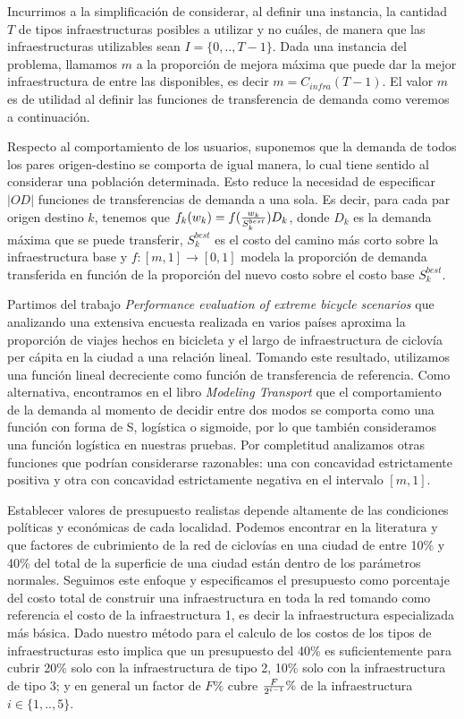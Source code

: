 \documentclass{article}
\begin{document}
  Incurrimos a la simplificación de considerar, al definir una instancia, la cantidad $T$ de tipos infraestructuras posibles a utilizar y no cuáles, de manera que las infraestructuras utilizables sean $I = \{0,.., T - 1\}$. Dada una instancia del problema, llamamos $m$ a la proporción de mejora máxima que puede dar la mejor infraestructura de entre las disponibles, es decir $m = C_{infra}(T - 1)$. El valor $m$ es de utilidad al definir las funciones de transferencia de demanda como veremos a continuación.

  Respecto al comportamiento de los usuarios, suponemos que la demanda de todos los pares origen-destino se comporta de igual manera, lo cual tiene sentido al considerar una población determinada. Esto reduce la necesidad de especificar $|OD|$ funciones de transferencias de demanda a una sola. Es decir, para cada par origen destino $k$, tenemos que $f_k(w_k) = f({w_k \over S^{best}_k})D_k$, donde $D_k$ es la demanda máxima que se puede transferir, $S^{best}_k$ es el costo del camino más corto sobre la infraestructura base y $f: [m, 1] \rightarrow [0, 1]$ modela la proporción de demanda transferida en función de la proporción del nuevo costo sobre el costo base $S^{best}_k$.

  Partimos del trabajo {\it Performance evaluation of extreme bicycle scenarios} \cite{shwe2014} que analizando una extensiva encuesta realizada en varios países aproxima la proporción de viajes hechos en bicicleta y el largo de infraestructura de ciclovía per cápita en la ciudad a una relación lineal. Tomando este resultado, utilizamos una función lineal decreciente como función de transferencia de referencia. Como alternativa, encontramos en el libro {\it Modeling Transport} \cite{ortuz2011} que el comportamiento de la demanda al momento de decidir entre dos modos se comporta como una función con forma de S, logística o sigmoide, por lo que también consideramos una función logística en nuestras pruebas. Por completitud analizamos otras funciones que podrían considerarse razonables: una con concavidad estrictamente positiva y otra con concavidad estrictamente negativa en el intervalo $[m, 1]$.

  Establecer valores de presupuesto realistas depende altamente de las condiciones políticas y económicas de cada localidad. Podemos encontrar en la literatura \cite{rios2015} y \cite{shwe2014} que factores de cubrimiento de la red de ciclovías en una ciudad de entre 10\% y 40\% del total de la superficie de una ciudad están dentro de los parámetros normales. Seguimos este enfoque y especificamos el presupuesto como porcentaje del costo total de construir una infraestructura en toda la red tomando como referencia el costo de la infraestructura 1, es decir la infraestructura especializada más básica. Dado nuestro método para el calculo de los costos de los tipos de infraestructuras esto implica que un presupuesto del 40\% es suficientemente para cubrir 20\% solo con la infraestructura de tipo 2, 10\% solo con la infraestructura de tipo 3; y en general un factor de $F\%$ cubre ${F \over {2^{i - 1}}}\%$ de la infraestructura $i \in \{1,..,5\}$.
\end{document}
